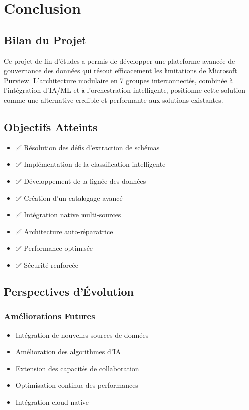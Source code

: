 \documentclass[12pt,a4paper]{article}
\begin{document}
\section{Conclusion}

\subsection{Bilan du Projet}

Ce projet de fin d'études a permis de développer une plateforme avancée de gouvernance des données qui résout efficacement les limitations de Microsoft Purview. L'architecture modulaire en 7 groupes interconnectés, combinée à l'intégration d'IA/ML et à l'orchestration intelligente, positionne cette solution comme une alternative crédible et performante aux solutions existantes.

\subsection{Objectifs Atteints}

\begin{itemize}
    \item ✅ Résolution des défis d'extraction de schémas
    \item ✅ Implémentation de la classification intelligente
    \item ✅ Développement de la lignée des données
    \item ✅ Création d'un catalogage avancé
    \item ✅ Intégration native multi-sources
    \item ✅ Architecture auto-réparatrice
    \item ✅ Performance optimisée
    \item ✅ Sécurité renforcée
\end{itemize}

\subsection{Perspectives d'Évolution}

\subsubsection{Améliorations Futures}
\begin{itemize}
    \item Intégration de nouvelles sources de données
    \item Amélioration des algorithmes d'IA
    \item Extension des capacités de collaboration
    \item Optimisation continue des performances
    \item Intégration cloud native
\end{itemize}
\end{document}
